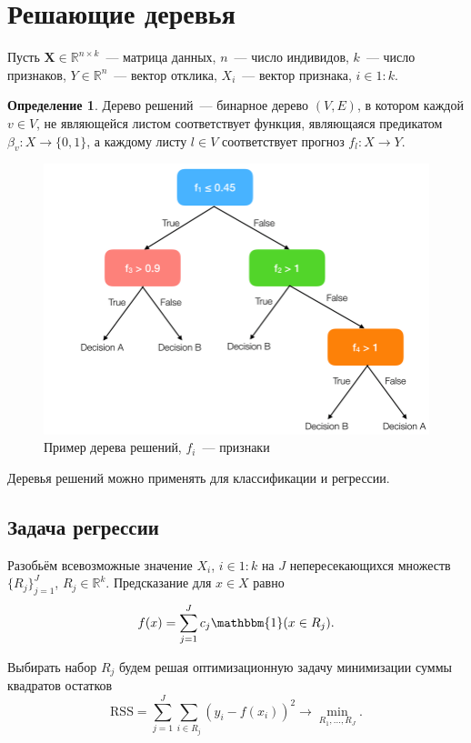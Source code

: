 \documentclass{article}
\theoremstyle{definition}
\newtheorem{definition}{Определение}
\theoremstyle{theorem}
\theoremstyle{remark}
\theoremstyle{theorem}
\theoremstyle{example}
\theoremstyle{theorem}
\theoremstyle{theorem}
\theoremstyle{theorem}
\theoremstyle{theorem}
\begin{document}
\tableofcontents

\newpage

\section{Решающие деревья}
	Пусть $\mathbf X\in\mathbb R^{n\times k}$~--- матрица данных, $n$~--- число индивидов, $k$~--- число признаков, $Y\in\mathbb R^n$~--- вектор отклика, $X_i$~--- вектор признака, $i\in1:k$.
	\begin{definition}
		Дерево решений~--- бинарное дерево $(V,E)$, в котором каждой $v\in V$, не являющейся листом соответствует функция, являющаяся предикатом $\beta_v:X\to\{0,1\}$, а каждому листу $l\in V$ соответствует прогноз $f_l:X\to Y$.
	\end{definition}
	\begin{figure}[h!]
			\includegraphics[width=\textwidth]{first}	\caption{Пример дерева решений, $f_i$~--- признаки}
	\end{figure}
	
	Деревья решений можно применять для классификации и регрессии.
	\subsection{Задача регрессии}
		Разобьём всевозможные значение $X_i$, $i\in1:k$ на $J$ непересекающихся множеств $\{R_j\}_{j=1}^J$, $R_j\in\mathbb R^k$. Предсказание для $x\in X$ равно $$f(x)=\sum\limits_{j=1}^Jc_j\mathbbm{1}(x\in R_j).$$
		
		Выбирать набор $R_j$ будем решая оптимизационную задачу минимизации суммы квадратов остатков $$\mathrm{RSS}=\sum\limits_{j=1}^J\sum\limits_{i\in R_j}(y_i-f(x_i))^2\to\min\limits_{R_1,\ldots,R_J}.$$ 
		
\end{document}
